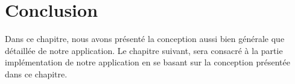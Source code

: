 \newpage

\section*{Conclusion}
  Dans ce chapitre, nous avons présenté la conception aussi bien générale que détaillée de notre application. Le chapitre suivant, sera consacré à la partie implémentation de notre application en se basant sur la conception présentée dans ce chapitre.